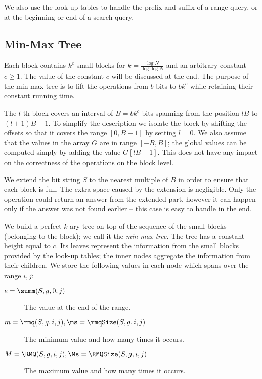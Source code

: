 We also use the look-up tables to handle the prefix and suffix of a range query, or at the beginning or end of a search query.

\subsection{Min-Max Tree}

Each block contains $k^c$ small blocks for $k = \frac{\log N}{\log \log N}$ and an arbitrary constant $c \ge 1$.
The value of the constant $c$ will be discussed at the end.
The purpose of the min-max tree is to lift the operations from $b$ bits to $b k^c$ while retaining their constant running time.

The $l$-th block covers an interval of $B = b k^c$ bits spanning from the position $l B$ to $(l + 1) B - 1$.
To simplify the description we isolate the block by shifting the offsets so that it covers the range $[0, B - 1]$ by setting $l = 0$.
We also assume that the values in the array $G$ are in range $[-B, B]$; the global values can be computed simply by adding the value $G[l B - 1]$.
This does not have any impact on the correctness of the operations on the block level.

We extend the bit string $S$ to the nearest multiple of $B$ in order to ensure that each block is full.
The extra space caused by the extension is negligible.
Only the \fwdSearch{} operation could return an answer from the extended part, however it can happen only if the answer was not found earlier -- this case is easy to handle in the end.

\bigbreak

We build a perfect $k$-ary tree on top of the sequence of the small blocks (belonging to the block); we call it the \emph{min-max tree}.
The tree has a constant height equal to $c$.
Its leaves represent the information from the small blocks provided by the look-up tables; the inner nodes aggregate the information from their children.
We store the following values in each node which spans over the range $i, j$:
\begin{description}
	\item[$e = \summ(S, g, 0, j)$] 
	The value at the end of the range.
	
	\item[$m = \rmq(S, g, i, j), \ms = \rmqSize(S, g, i, j)$]
	The minimum value and how many times it occurs.
	
	\item[$M = \RMQ(S, g, i, j), \Ms = \RMQSize(S, g, i, j)$]
	The maximum value and how many times it occurs.
\end{description}

